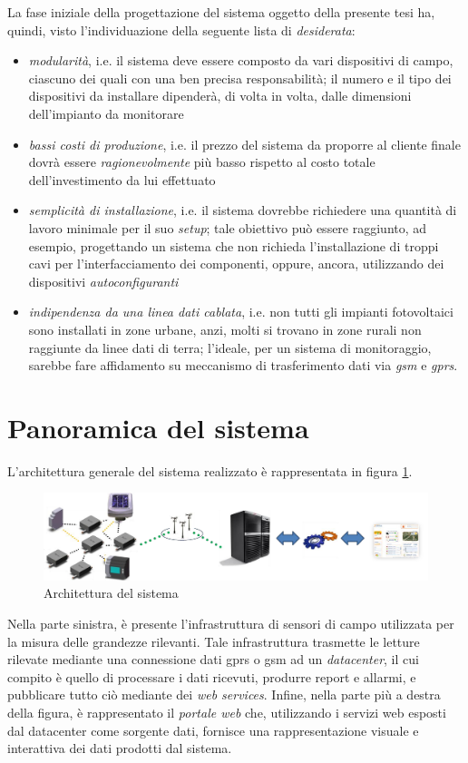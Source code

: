 %
La fase iniziale della progettazione del sistema oggetto della presente tesi
ha, quindi, visto l'individuazione della seguente lista di \emph{desiderata}:
%
\begin{itemize}
\item \emph{modularit\`a}, i.e. il sistema deve essere composto da vari dispositivi di 
      campo, ciascuno dei quali con una ben precisa responsabilit\`a; il numero e il 
      tipo dei dispositivi da installare dipender\`a, di volta in volta, dalle dimensioni 
      dell'impianto da monitorare
%
\item \emph{bassi costi di produzione}, i.e. il prezzo del sistema da proporre al cliente 
      finale dovr\`a essere \emph{ragionevolmente} pi\`u basso rispetto al costo totale 
      dell'investimento da lui effettuato
%
\item \emph{semplicit\`a di installazione}, i.e. il sistema dovrebbe richiedere una quantit\`a
      di lavoro minimale per il suo \emph{setup}; tale obiettivo pu\`o essere raggiunto, ad esempio,  
      progettando un sistema che non richieda l'installazione di troppi cavi per 
      l'interfacciamento dei componenti, oppure, ancora, utilizzando dei dispositivi 
      \emph{autoconfiguranti}
%      
\item \emph{indipendenza da una linea dati cablata}, i.e. non tutti gli impianti fotovoltaici
      sono installati in zone urbane, anzi, molti si trovano in zone rurali non raggiunte da linee 
      dati di terra; l'ideale, per un sistema di monitoraggio, sarebbe fare affidamento
      su meccanismo di trasferimento dati via \emph{gsm} e \emph{gprs}.
%
\end{itemize}
%

\section{Panoramica del sistema}
%
L'architettura generale del sistema realizzato \`e rappresentata in figura 
\ref{architettura-sistema}.
%
\begin{figure}[!h]
\centering
\includegraphics[width=400pt]{img/architecture.png}
\caption{Architettura del sistema}
\label{architettura-sistema}
\end{figure}
%
Nella parte sinistra, \`e presente l'infrastruttura di sensori di campo 
utilizzata per la misura delle grandezze rilevanti.
%
Tale infrastruttura trasmette le letture rilevate mediante una connessione dati 
gprs o gsm ad un \emph{datacenter}, il cui compito \`e quello di processare i dati 
ricevuti, produrre report e allarmi, e pubblicare tutto ci\`o mediante dei 
\emph{web services}.
%
Infine, nella parte pi\`u a destra della figura, \`e rappresentato il \emph{portale web} 
che, utilizzando i servizi web esposti dal datacenter come sorgente dati, fornisce 
una rappresentazione visuale e interattiva dei dati prodotti dal sistema.
%

